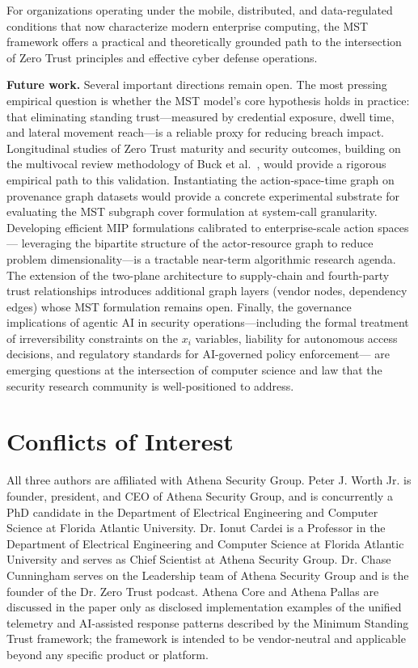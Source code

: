 \documentclass[acmlarge]{acmart}
\begin{document}
For organizations operating under the mobile, distributed, and data-regulated conditions
that now characterize modern enterprise computing, the MST framework offers a practical
and theoretically grounded path to the intersection of Zero Trust principles and effective
cyber defense operations.

\textbf{Future work.} Several important directions remain open. The most pressing empirical question is whether the MST model's core
hypothesis holds in practice: that eliminating standing trust---measured by
credential exposure, dwell time, and lateral movement reach---is a reliable
proxy for reducing breach impact.
Longitudinal studies of Zero Trust maturity and security outcomes,
building on the multivocal review methodology of Buck et al.\ \cite{buck2021},
would provide a rigorous empirical path to this validation.
Instantiating the action-space-time graph on provenance graph datasets
\cite{hassan2020provenance} would provide a concrete experimental substrate for
evaluating the MST subgraph cover formulation at system-call granularity.
Developing efficient MIP formulations calibrated to enterprise-scale action spaces---
leveraging the bipartite structure of the actor-resource graph to reduce problem
dimensionality---is a tractable near-term algorithmic research agenda. The
extension of the two-plane architecture to supply-chain and fourth-party trust
relationships introduces additional graph layers (vendor nodes, dependency edges)
whose MST formulation remains open. Finally, the governance implications of
agentic AI in security operations---including the formal treatment of
irreversibility constraints on the $x_i$ variables, liability for autonomous
access decisions, and regulatory standards for AI-governed policy enforcement---
are emerging questions at the intersection of computer science and law that the
security research community is well-positioned to address.





\section*{Conflicts of Interest}
All three authors are affiliated with Athena Security Group. Peter J. Worth Jr. is founder, president, and CEO of Athena Security Group, and is concurrently a PhD candidate in the Department of Electrical Engineering and Computer Science at Florida Atlantic University. Dr. Ionut Cardei is a Professor in the Department of Electrical Engineering and Computer Science at Florida Atlantic University and serves as Chief Scientist at Athena Security Group. Dr. Chase Cunningham serves on the Leadership team of Athena Security Group and is the founder of the Dr. Zero Trust podcast. Athena Core and Athena Pallas are discussed in the paper only as disclosed implementation examples of the unified telemetry and AI-assisted response patterns described by the Minimum Standing Trust framework; the framework is intended to be vendor-neutral and applicable beyond any specific product or platform.
\end{document}
